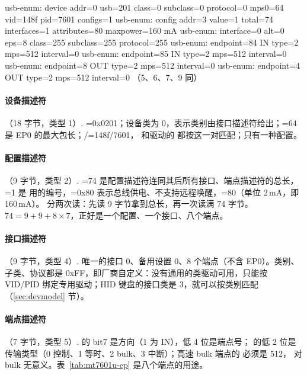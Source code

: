 \begin{txtcode}
usb-enum: device addr=0 usb=201 class=0 subclass=0 protocol=0 mps0=64 vid=148f pid=7601 configs=1
usb-enum: config addr=3 value=1 total=74 interfaces=1 attributes=80 maxpower=160 mA
usb-enum:  interface=0 alt=0 eps=8 class=255 subclass=255 protocol=255
usb-enum:   endpoint=84 IN type=2 mps=512 interval=0
usb-enum:   endpoint=85 IN type=2 mps=512 interval=0
usb-enum:   endpoint=8 OUT type=2 mps=512 interval=0
usb-enum:   endpoint=4 OUT type=2 mps=512 interval=0    （5、6、7、9 同）
\end{txtcode}

\paragraph{设备描述符}（18 字节，类型 1）. =0x0201；设备类为 0，表示类别由接口描述符给出；=64 是 EP0 的最大包长；/=148f/7601， 和驱动的  都按这一对匹配；只有一种配置。

\paragraph{配置描述符}（9 字节，类型 2）. =74 是配置描述符连同其后所有接口、端点描述符的总长，=1 是  用的编号，=0x80 表示总线供电、不支持远程唤醒，=80（单位 2\,mA，即 160\,mA）。 分两次读：先读 9 字节拿到总长，再一次读满 74 字节。$74 = 9 + 9 + 8\times 7$，正好是一个配置、一个接口、八个端点。

\paragraph{接口描述符}（9 字节，类型 4）. 唯一的接口 0、备用设置 0、8 个端点（不含 EP0）。类别、子类、协议都是 0xFF，即厂商自定义：没有通用的类驱动可用，只能按 VID/PID 绑定专用驱动；HID 键盘的接口类是 3，就可以按类别匹配（\ref{sec:devmodel} 节）。

\paragraph{端点描述符}（7 字节，类型 5）.  的 bit7 是方向（1 为 IN），低 4 位是端点号； 的低 2 位是传输类型（0 控制、1 等时、2 bulk、3 中断）；高速 bulk 端点的  必须是 512， 对 bulk 无意义。表~\ref{tab:mt7601u-ep} 是八个端点的用途。

